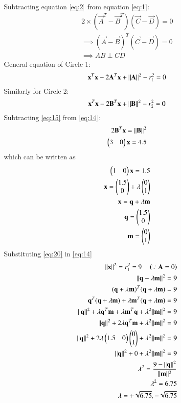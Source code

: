 \documentclass[journal,12pt,twocolumn]{IEEEtran}
\begin{document}
Subtracting equation \ref{eq:2} from equation \ref{eq:1}:
\begin{align}
2\times(\vec{A}^T-\vec{B}^T)(\vec{C}-\vec{D})=0
\\
\implies (\vec{A}-\vec{B})^T(\vec{C}-\vec{D})=0
\\
\implies AB\perp CD
\end{align}
General equation of Circle 1:
\begin{align}
\mathbf{x}^T\mathbf{x} - 2\mathbf{A}^T\mathbf{x} + \lVert\mathbf{A}\rVert^2 -r_{1}^2 = 0\label{eq:14}
\end{align}
Similarly for Circle 2:
\begin{align}
\mathbf{x}^T\mathbf{x} - 2\mathbf{B}^T\mathbf{x} + \lVert\mathbf{B}\rVert^2 -r_{2}^2 = 0\label{eq:15}
\end{align}
Subtracting \eqref{eq:15} from \eqref{eq:14}:
\begin{align}
2\mathbf{B}^T\mathbf{x}=\lVert\mathbf{B}\rVert^2
\\
\begin{pmatrix}3&0\end{pmatrix}\mathbf{x}=4.5
\end{align}
which can be written as
\begin{align}
\begin{pmatrix}1&0\end{pmatrix}\mathbf{x}=1.5\\
\mathbf{x}=\begin{pmatrix}1.5\\ 0\end{pmatrix} + \lambda \begin{pmatrix}0\\1\end{pmatrix}\label{eq:19}\\
\mathbf{x}=\mathbf{q}+\lambda\mathbf{m}\label{eq:20}\\
\mathbf{q}=\begin{pmatrix}1.5\\ 0\end{pmatrix} \\
\mathbf{m}=\begin{pmatrix}0\\1\end{pmatrix}
\end{align}
Substituting \eqref{eq:20} in \eqref{eq:14}
\begin{align}
\lVert\mathbf{x}\rVert^2=r_{1}^2=9\quad \left(\because \mathbf{A}=0\right)
\\
\lVert\mathbf{q}+\lambda\mathbf{m}\rVert^2=9\\
(\mathbf{q}+\lambda \mathbf{m})^T(\mathbf{q}+\lambda \mathbf{m})=9\\
\mathbf{q}^T(\mathbf{q}+\lambda \mathbf{m})+\lambda \mathbf{m}^T(\mathbf{q}+\lambda \mathbf{m})=9
\\
\lVert\mathbf{q}\rVert^2+\lambda\mathbf{q}^T\mathbf{m}+\lambda\mathbf{m}^T\mathbf{q}+\lambda^2\lVert\mathbf{m}\rVert^2=9
\\
\lVert\mathbf{q}\rVert^2+2\lambda\mathbf{q}^T\mathbf{m}+\lambda^2\lVert\mathbf{m}\rVert^2=9 
\\
\lVert\mathbf{q}\rVert^2+2\lambda\begin{pmatrix}1.5&0\end{pmatrix}\begin{pmatrix}0\\1\end{pmatrix}+\lambda^2\lVert\mathbf{m}\rVert^2=9 
\\
\lVert\mathbf{q}\rVert^2+0+\lambda^2\lVert\mathbf{m}\rVert^2=9\\
\lambda^2=\frac{9-\lVert\mathbf{q}\rVert^2}{\lVert\mathbf{m}\rVert^2}\\
\lambda^2=6.75\\
\lambda=+\sqrt{6.75},-\sqrt{6.75}
\end{align}
\end{document}

